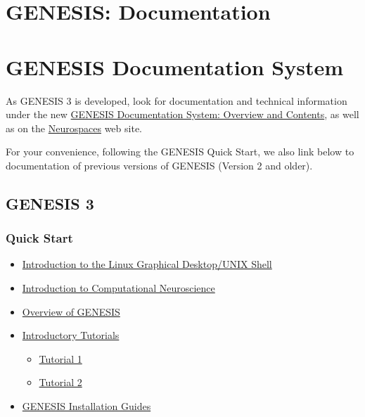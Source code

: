 \documentclass[12pt]{article}
\begin{document}
\section*{GENESIS: Documentation}

\section*{GENESIS Documentation System}

As GENESIS 3 is developed, look for documentation and technical information under the new \href{../documentation-overview/documentation-overview.tex}{GENESIS Documentation System: Overview and Contents}, as well as on the \href{http://www.neurospaces.org}{Neurospaces} web site.

For your convenience, following the GENESIS Quick Start, we also link below to documentation of previous versions of GENESIS (Version 2 and older).

\subsection*{GENESIS 3}

\subsubsection*{Quick Start}

\begin{itemize}

\item \href{../unix-linux/unix-linux.tex}{Introduction to the Linux Graphical Desktop/UNIX Shell}

\item \href{../compneurosci-1/compneurosci-1.tex}{Introduction to Computational Neuroscience}

\item \href{../genesis-overview/genesis-overview.tex}{Overview of GENESIS}

\item \href{../contents-level1/contents-level1.tex}{Introductory Tutorials}
  \begin{itemize}
  \item \href{../tutorial1/tutorial1.tex}{Tutorial 1}

  \item \href{../tutorial2/tutorial2.tex}{Tutorial 2}
  \end{itemize}

\item \href{../installation/installation.tex}{GENESIS Installation Guides}

\end{itemize}
\end{document}
